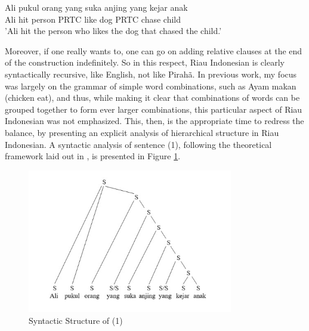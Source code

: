 \documentclass[output=paper,colorlinks,citecolor=brown
]{langscibook}
\begin{document}
\ea
\gll Ali	pukul	orang	yang	suka	anjing	yang	kejar	anak\\
 Ali	hit	person	\textsc{PRTC}	like	dog	\textsc{PRTC}	chase	child\\
\glt 'Ali hit the person who likes the dog that chased the child.'
\z

Moreover, if one really wants to, one can go on adding relative clauses at the end of the construction indefinitely. So in this respect, Riau Indonesian is clearly syntactically recursive, like English, not like Pirahã.
In previous work, my focus was largely on the grammar of simple word combinations, such as Ayam makan (chicken eat), and thus, while making it clear that combinations of words can be grouped together to form ever larger combinations, this particular aspect of Riau Indonesian was not emphasized. This, then, is the appropriate time to redress the balance, by presenting an explicit analysis of hierarchical structure in Riau Indonesian. A syntactic analysis of sentence (1), following the theoretical framework laid out in \citet{gil2000syntactic}, is presented in Figure \ref{fig:fig1}.

\begin{figure}[hbt!]
\centering
\includegraphics[width=0.8\textwidth]{gil_figure1.png}
\caption{\label{fig:fig1}Syntactic Structure of (1)}
\end{figure}
\end{document}
